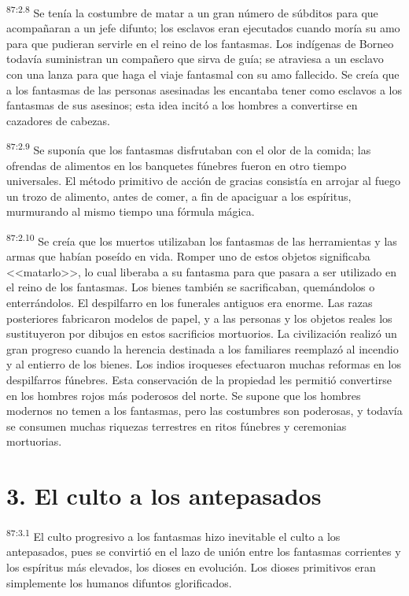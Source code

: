 \documentclass[twoside, 11pt]{book}
\begin{document}
\par
\textsuperscript{87:2.8} Se tenía la costumbre de matar a un gran número de súbditos para que acompañaran a un jefe difunto; los esclavos eran ejecutados cuando moría su amo para que pudieran servirle en el reino de los fantasmas. Los indígenas de Borneo todavía suministran un compañero que sirva de guía; se atraviesa a un esclavo con una lanza para que haga el viaje fantasmal con su amo fallecido. Se creía que a los fantasmas de las personas asesinadas les encantaba tener como esclavos a los fantasmas de sus asesinos; esta idea incitó a los hombres a convertirse en cazadores de cabezas.

\par
\textsuperscript{87:2.9} Se suponía que los fantasmas disfrutaban con el olor de la comida; las ofrendas de alimentos en los banquetes fúnebres fueron en otro tiempo universales. El método primitivo de acción de gracias consistía en arrojar al fuego un trozo de alimento, antes de comer, a fin de apaciguar a los espíritus, murmurando al mismo tiempo una fórmula mágica.

\par
\textsuperscript{87:2.10} Se creía que los muertos utilizaban los fantasmas de las herramientas y las armas que habían poseído en vida. Romper uno de estos objetos significaba <<matarlo>>, lo cual liberaba a su fantasma para que pasara a ser utilizado en el reino de los fantasmas. Los bienes también se sacrificaban, quemándolos o enterrándolos. El despilfarro en los funerales antiguos era enorme. Las razas posteriores fabricaron modelos de papel, y a las personas y los objetos reales los sustituyeron por dibujos en estos sacrificios mortuorios. La civilización realizó un gran progreso cuando la herencia destinada a los familiares reemplazó al incendio y al entierro de los bienes. Los indios iroqueses efectuaron muchas reformas en los despilfarros fúnebres. Esta conservación de la propiedad les permitió convertirse en los hombres rojos más poderosos del norte. Se supone que los hombres modernos no temen a los fantasmas, pero las costumbres son poderosas, y todavía se consumen muchas riquezas terrestres en ritos fúnebres y ceremonias mortuorias.

\section*{3. El culto a los antepasados}
\par
\textsuperscript{87:3.1} El culto progresivo a los fantasmas hizo inevitable el culto a los antepasados, pues se convirtió en el lazo de unión entre los fantasmas corrientes y los espíritus más elevados, los dioses en evolución. Los dioses primitivos eran simplemente los humanos difuntos glorificados.
\end{document}
